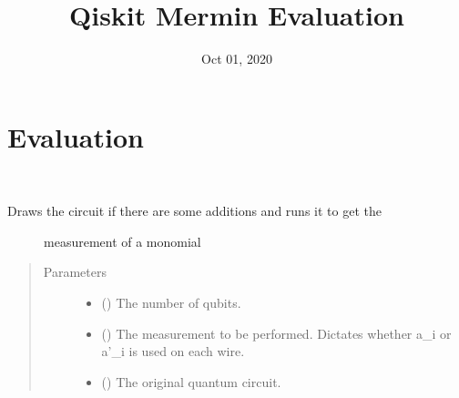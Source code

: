 \documentclass[letterpaper,10pt,english]{sphinxmanual}
\title{Qiskit Mermin Evaluation}
\date{Oct 01, 2020}
\author{}
\begin{document}
\pagestyle{empty}
\sphinxmaketitle
\pagestyle{plain}
\sphinxtableofcontents
\pagestyle{normal}
\label{\detokenize{index::doc}}



\chapter{Evaluation}
\label{\detokenize{evaluation:module-mermin_on_qiskit.evaluation}}\label{\detokenize{evaluation:evaluation}}\label{\detokenize{evaluation::doc}}

\begin{fulllineitems}
\label{\detokenize{evaluation:mermin_on_qiskit.evaluation.evaluate_monomial}}~\begin{description}
\item[{Draws the circuit if there are some additions and runs it to get the }] \leavevmode
measurement of a monomial

\end{description}
\begin{quote}\begin{description}
\item[{Parameters}] \leavevmode\begin{itemize}
\item {} 
 () \textendash{} The number of qubits.

\item {} 
 () \textendash{} The measurement to be performed. Dictates whether a\_i 
or a’\_i is used on each wire.

\item {} 
 () \textendash{} The original quantum circuit.


\end{itemize}
\end{description}
\end{quote}
\end{fulllineitems}
\end{document}
